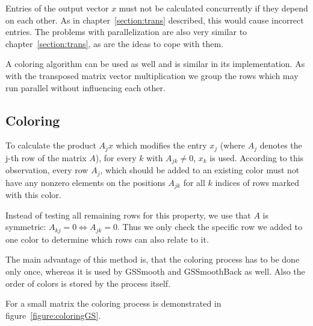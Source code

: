 \documentclass[a4paper,11pt]{scrartcl}
\begin{document}
Entries of the output vector $x$ must not be calculated concurrently if they
depend on each other. As in chapter~\ref{section:trans} described, this would
cause incorrect entries. The problems with parallelization are also very
similar to chapter~\ref{section:trans}, as are the ideas to cope with them.

A coloring algorithm can be used as well and is similar in its implementation.
As with the transposed matrix vector multiplication we group the rows which
may run parallel without influencing each other.

\subsection{Coloring}
To calculate the product $A_jx$ which modifies the entry $x_j$ (where $A_j$
denotes the j-th row of the matrix $A$), for every $k$ with $A_{jk} \neq 0$,
$x_k$ is used. According to this observation, every row $A_j$, which should be
added to an existing color must not have any nonzero elements on the positions $A_{jk}$
for all $k$ indices of rows marked with this color.

Instead of testing all remaining rows for this property, we use that $A$ is
symmetric: $A_{kj} = 0 \Leftrightarrow A_{jk} = 0$. Thus we only check
the specific row we added to one color to determine which rows can also
relate to it.

The main advantage of this method is, that the coloring process has to be
done only once, whereas it is used by GSSmooth and GSSmoothBack as well.
Also the order of colors is stored by the process itself.

For a small matrix the coloring process is demonstrated in
figure~\ref{figure:coloringGS}.
\end{document}
